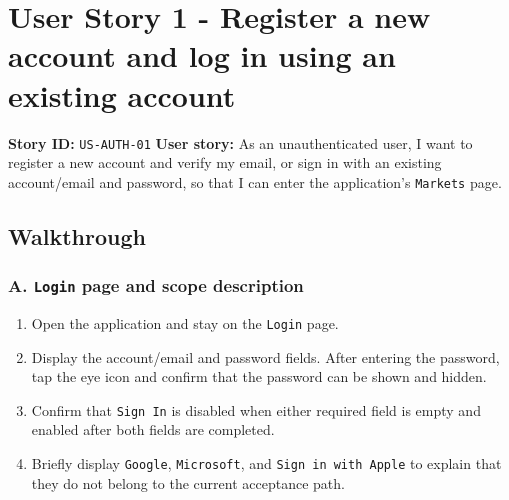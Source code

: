 \section{User Story 1 - Register a new account and log in using an existing account}
\textbf{Story ID:} \texttt{US-AUTH-01}
\textbf{User story:} As an unauthenticated user, I want to register a new account and verify my email, or sign in with an existing account/\allowbreak{}email and password, so that I can enter the application's \texttt{Markets} page.
\subsection{Walkthrough}
\subsubsection{A. \texttt{Login} page and scope description}
\begin{enumerate}
\item Open the application and stay on the \texttt{Login} page.
\item Display the account/\allowbreak{}email and password fields. After entering the password, tap the eye icon and confirm that the password can be shown and hidden.
\item Confirm that \texttt{Sign In} is disabled when either required field is empty and enabled after both fields are completed.
\item Briefly display \texttt{Google}, \texttt{Microsoft}, and \texttt{Sign in with Apple} to explain that they do not belong to the current acceptance path.
\end{enumerate}
